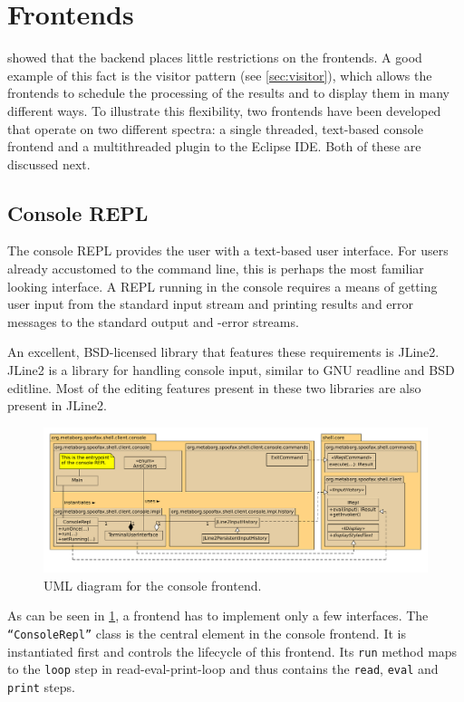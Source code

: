 \section{Frontends}
\label{sec:frontends}

 showed that the backend places little restrictions on the
frontends. A good example of this fact is the visitor pattern (see
\cref{sec:visitor}), which allows the frontends to schedule the processing of
the results and to display them in many different ways.  To illustrate this
flexibility, two frontends have been developed that operate on two different
spectra: a single threaded, text-based console frontend and a multithreaded
plugin to the Eclipse IDE. Both of these are discussed next.

\subsection{Console REPL}
\label{ssec:consolerepl}

The console REPL provides the user with a text-based user interface. For users
already accustomed to the command line, this is perhaps the most familiar
looking interface. A REPL running in the console requires a means of getting
user input from the standard input stream and printing results and error
messages to the standard output and -error streams.

An excellent, BSD-licensed library that features these requirements is JLine2.
JLine2 is a library for handling console input, similar to GNU readline and BSD
editline. Most of the editing features present in these two libraries are also
present in JLine2.

\begin{figure}[h]
  \includegraphics[width=\textwidth]{uml-console}
  \caption{UML diagram for the console frontend.}
  \label{fig:uml-console}
\end{figure}

As can be seen in \cref{fig:uml-console}, a frontend has to implement only a few
interfaces. The \texttt{``ConsoleRepl''} class is the central element in the
console frontend. It is instantiated first and controls the lifecycle of this
frontend. Its \texttt{run} method maps to the \texttt{loop} step in
read-eval-print-loop and thus contains the \texttt{read}, \texttt{eval} and
\texttt{print} steps.

